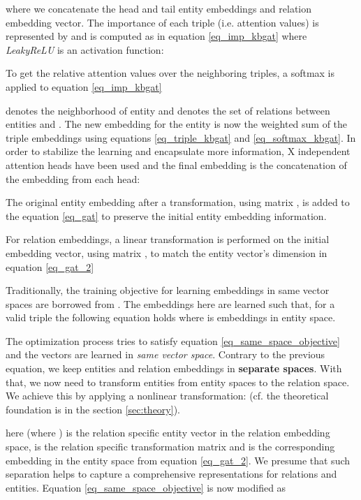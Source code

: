 \documentclass[sigconf]{acmart}
\begin{document}
where we concatenate the head and tail entity embeddings and relation embedding vector. 
The importance of each triple (i.e. attention values) is represented by  and is computed as in equation \ref{eq_imp_kbgat} where \textit{LeakyReLU} is an activation function:

To get the relative attention values over the neighboring triples, a softmax is applied to equation
\ref{eq_imp_kbgat}

 denotes the neighborhood of entity  and  denotes the set of relations between entities  and .
The new embedding for the entity  is now the weighted sum of the triple embeddings using equations \ref{eq_triple_kbgat} and \ref{eq_softmax_kbgat}. In order to stabilize the learning and encapsulate more information, X independent attention heads have been used and the final embedding is the concatenation of the embedding from each head:

The original entity embedding  after a transformation, using matrix , is added to the equation \ref{eq_gat} to preserve the initial entity embedding information. 

For relation embeddings, a linear transformation is performed on the initial embedding vector, using matrix , to match the entity vector's dimension in equation \ref{eq_gat_2}

Traditionally, the training objective for learning embeddings in same vector spaces are borrowed from \cite{DBLP:conf/nips/BordesUGWY13}. The embeddings here are learned such that, for a valid triple  the following equation holds where  is embeddings in entity space.

The optimization process tries to satisfy equation \ref{eq_same_space_objective} and the vectors are learned in \textit{same vector space}.
Contrary to the previous equation, we keep entities and relation embeddings in \textbf{separate spaces}. With that, we now need to transform entities from entity spaces to the relation space. We achieve this by applying a nonlinear transformation:
(cf. the theoretical foundation is in the section \ref{sec:theory}).

here  
(where ) is the relation specific entity vector in the relation embedding space,  is the relation specific transformation matrix and  is the corresponding embedding in the entity space from equation \ref{eq_gat_2}. We presume that such separation helps to capture a comprehensive representations for relations and entities. Equation \ref{eq_same_space_objective} is now modified as
\end{document}
